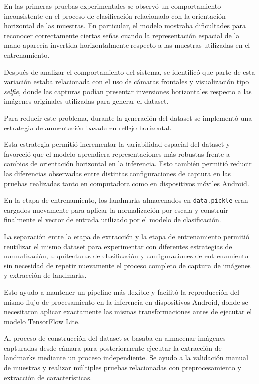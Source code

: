 	
	
	En las primeras pruebas experimentales se observó un comportamiento
	inconsistente en el proceso de clasificación relacionado con la orientación horizontal de
	las muestras. En particular, el modelo mostraba dificultades para reconocer
	correctamente ciertas señas cuando la representación espacial de la mano aparecía
	invertida horizontalmente respecto a las muestras utilizadas en el
	entrenamiento.
	
	Después de analizar el comportamiento del sistema, se identificó que parte de
	esta variación estaba relacionada con el uso de cámaras frontales y visualización
	tipo \textit{selfie}, donde las capturas podían presentar inversiones
	horizontales respecto a las imágenes originales utilizadas para generar el
	dataset.
	
	Para reducir este problema, durante la generación del dataset se implementó una
	estrategia de aumentación basada en reflejo horizontal.
	
	Esta estrategia permitió incrementar la variabilidad espacial del dataset y
	favoreció que el modelo aprendiera representaciones más robustas frente a cambios
	de orientación horizontal en la inferencia. Esto también permitió reducir
	las diferencias observadas entre distintas configuraciones de captura en las
	pruebas realizadas tanto en computadora como en dispositivos móviles Android.
	
	En la etapa de entrenamiento, los landmarks almacenados en
	\texttt{data.pickle} eran cargados nuevamente para aplicar la normalización por
	escala y construir finalmente el vector de entrada utilizado por el modelo de
	clasificación.
	
	La separación entre la etapa de extracción y la etapa de entrenamiento permitió
	reutilizar el mismo dataset para experimentar con diferentes estrategias de
	normalización, arquitecturas de clasificación y configuraciones de entrenamiento
	sin necesidad de repetir nuevamente el proceso completo de captura de imágenes y
	extracción de landmarks.
	
	Esto ayudo a mantener un pipeline más flexible y facilitó
	la reproducción del mismo flujo de procesamiento en la inferencia en
	dispositivos Android, donde se necesitaron aplicar exactamente las mismas
	transformaciones antes de ejecutar el modelo TensorFlow Lite.
	
	Al proceso de construcción del dataset se basaba en almacenar
	imágenes capturadas desde cámara para posteriormente ejecutar la extracción de
	landmarks mediante un proceso independiente. Se ayudo a la 
	validación manual de muestras y realizar múltiples pruebas relacionadas con
	preprocesamiento y extracción de características.
	
